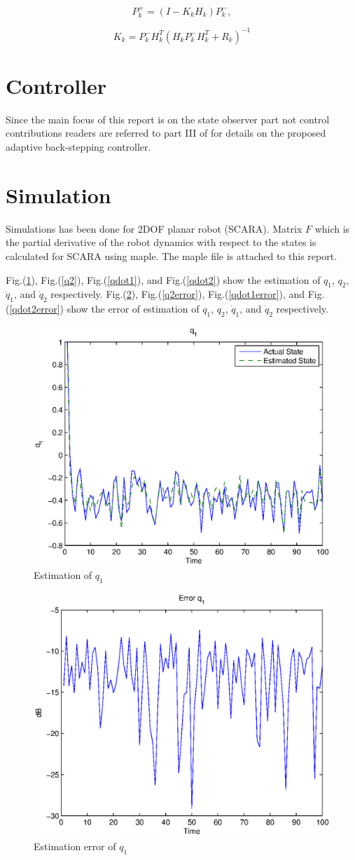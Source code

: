\documentclass[conference]{IEEEtran}
\begin{document}
\begin{equation}
P_k^ +  = (I - {K_k}{H_k})P_k^ - ,
\label{38}
\end{equation}

\begin{equation}
{K_k} = P_k^ - H_k^T{({H_k}P_k^ - H_k^T + {R_k})^{ - 1}}
\label{39}
\end{equation}



\section{Controller}
Since the main focus of this report is on the state observer part not control
contributions readers are referred to part III of \cite{article} for details on
the proposed adaptive back-stepping controller.


\section{Simulation}
Simulations has been done for 2DOF planar robot (SCARA). Matrix $F$ which is the
partial derivative of the robot dynamics with respect to the states is
calculated for SCARA using maple. The maple file is attached to this report. 

Fig.(\ref{q1}), Fig.(\ref{q2}), Fig.(\ref{qdot1}), and Fig.(\ref{qdot2}) show
the estimation of $q_1$, $q_2$, $\dot q_1$, and $\dot q_2$ respectively.
Fig.(\ref{q1error}), Fig.(\ref{q2error}), Fig.(\ref{qdot1error}), and
Fig.(\ref{qdot2error}) show the error of estimation of $q_1$, $q_2$, $\dot q_1$,
and $\dot q_2$ respectively.

\begin{figure}
\centering
\includegraphics[width=.4 \textwidth]{q1.eps}
\caption{Estimation of $q_1$}
\label{q1}
\end{figure}

\begin{figure}
\centering
\includegraphics[width=.4 \textwidth]{q1error.eps}
\caption{Estimation error of $q_1$}
\label{q1error}
\end{figure}
\end{document}
